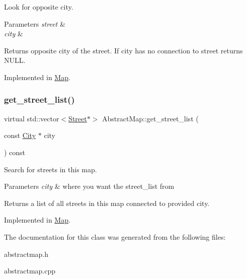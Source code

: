 Look for opposite city. 


\begin{DoxyParams}{Parameters}
{\em street} & \\
\hline
{\em city} & \\
\hline
\end{DoxyParams}
\begin{DoxyReturn}{Returns}
opposite city of the street. If city has no connection to street returns N\+U\+LL. 
\end{DoxyReturn}


Implemented in \hyperlink{class_map_ac52744dc6f969ca6cdbca96f89d314ed}{Map}.

\mbox{\label{class_abstract_map_a228d43b47211f3836fdc66760831d61d}} 
\subsubsection{\texorpdfstring{get\+\_\+street\+\_\+list()}{get\_street\_list()}}
{\footnotesize\ttfamily virtual std\+::vector$<$\hyperlink{class_street}{Street}$\ast$$>$ Abstract\+Map\+::get\+\_\+street\+\_\+list (\begin{DoxyParamCaption}\item[{const \hyperlink{class_city}{City} $\ast$}]{city }\end{DoxyParamCaption}) const\hspace{0.3cm}{\ttfamily [pure virtual]}}



Search for streets in this map. 


\begin{DoxyParams}{Parameters}
{\em city} & where you want the street\+\_\+list from \\
\hline
\end{DoxyParams}
\begin{DoxyReturn}{Returns}
a list of all streets in this map connected to provided city. 
\end{DoxyReturn}


Implemented in \hyperlink{class_map_a24c8fa29273d26e301f889ab81d696e3}{Map}.



The documentation for this class was generated from the following files\+:\begin{DoxyCompactItemize}
\item 
abstractmap.\+h\item 
abstractmap.\+cpp\end{DoxyCompactItemize}
